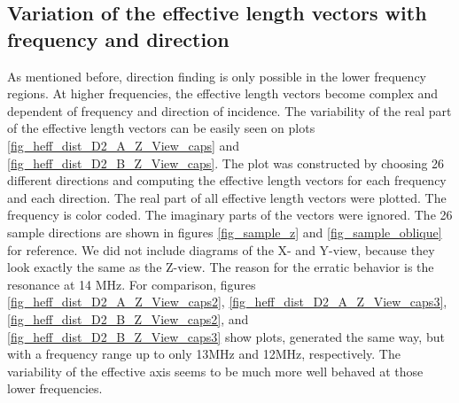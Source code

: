 \documentclass[a4paper,14pt]{extbook}
\begin{document}
\subsection{Variation of the effective length vectors with frequency and direction}

As mentioned before, direction finding is only possible in the lower frequency regions. At higher frequencies, the effective length vectors become complex and dependent of frequency and direction of incidence. The variability of the real part of the effective length vectors can be easily seen on plots \ref{fig_heff_dist_D2_A_Z_View_caps} and \ref{fig_heff_dist_D2_B_Z_View_caps}. The plot was constructed by choosing 26 different directions and computing the effective length vectors for each frequency and each direction. The real part of all effective length vectors were plotted. The frequency is color coded. The imaginary parts of the vectors were ignored. The 26 sample directions are shown in figures \ref{fig_sample_z} and \ref{fig_sample_oblique} for reference. We did not include diagrams of the X- and Y-view, because they look exactly the same as the Z-view. The reason for the erratic behavior is the resonance at 14 MHz. For comparison, figures \ref{fig_heff_dist_D2_A_Z_View_caps2}, \ref{fig_heff_dist_D2_A_Z_View_caps3}, \ref{fig_heff_dist_D2_B_Z_View_caps2}, and \ref{fig_heff_dist_D2_B_Z_View_caps3} show plots, generated the same way, but with a frequency range up to only 13MHz and 12MHz, respectively. The variability of the effective axis seems to be much more well behaved at those lower frequencies.\\
\end{document}
